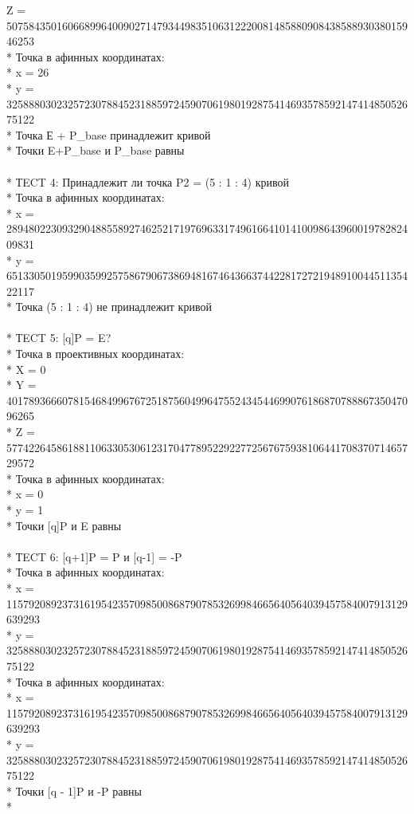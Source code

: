 \documentclass[12pt]{article}
\begin{document}
Z = 50758435016066899640090271479344983510631222008148588090843858893038015946253\\*
Точка в афинных координатах:\\*
x = 26\\*
y = 32588803023257230788452318859724590706198019287541469357859214741485052675122\\*
Точка Е + P\_base принадлежит кривой\\*
Точки E+P\_base и P\_base равны\\
\\*
ТECT 4: Принадлежит ли точка P2 = (5 : 1 : 4) кривой\\*
Точка в афинных координатах:\\*
x = 28948022309329048855892746252171976963317496166410141009864396001978282409831\\*
y = 65133050195990359925758679067386948167464366374422817272194891004451135422117\\*
Точка (5 : 1 : 4) не принадлежит кривой\\
\\*
ТECT 5: [q]P = E?\\*
Точка в проективных координатах:\\*
X = 0\\*
Y = 40178936660781546849967672518756049964755243454469907618687078886735047096265\\*
Z = 57742264586188110633053061231704778952292277256767593810644170837071465729572\\*
Точка в афинных координатах:\\*
x = 0\\*
y = 1\\*
Точки [q]P и E равны\\
\\*
ТECT 6: [q+1]P = P и [q-1] = -P\\*
Точка в афинных координатах:\\*
x = 115792089237316195423570985008687907853269984665640564039457584007913129639293\\*
y = 32588803023257230788452318859724590706198019287541469357859214741485052675122\\*
Точка в афинных координатах:\\*
x = 115792089237316195423570985008687907853269984665640564039457584007913129639293\\*
y = 32588803023257230788452318859724590706198019287541469357859214741485052675122\\*
Точки [q - 1]P и -P равны\\*
\end{document}
